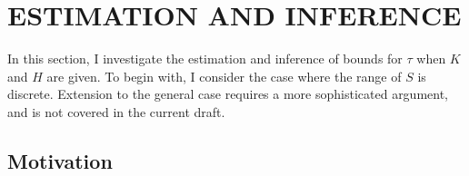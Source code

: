 \documentclass[12pt]{article}
\newtheorem{rmk}{Remark}
\newcommand{\Indc}{\mathbb{I}}
\begin{document}
		

    \section{ESTIMATION AND INFERENCE}
	In this section, I investigate the estimation and inference of bounds for $\tau$ when $K$ and $H$ are given. To begin with, I consider the case where the range of $S$ is discrete. Extension to the general case requires a more sophisticated argument, and is not covered in the current draft.
	\subsection{Motivation}
	
\end{document}
